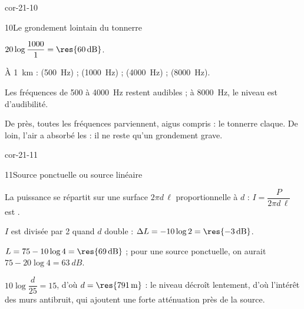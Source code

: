 \begin{blocLivre}{cor-21-10}
\begin{corrige}{10}{Le grondement lointain du tonnerre}
\begin{questions}
\item $20\log\dfrac{1000}{1}=\res{\qty{60}{dB}}$.
\item À \qty{1}{km} :  (\qty{500}{Hz}) ;  (\qty{1000}{Hz}) ;  (\qty{4000}{Hz}) ;
 (\qty{8000}{Hz}).
\item Les fréquences de 500 à \qty{4000}{Hz} restent audibles ; à \qty{8000}{Hz}, le niveau est 
d'audibilité.
\item De près, toutes les fréquences parviennent, aigus compris : le tonnerre claque. De loin, l'air a absorbé les
 : il ne reste qu'un grondement grave.
\end{questions}
\end{corrige}
\end{blocLivre}
\begin{blocLivre}{cor-21-11}
\begin{corrige}{11}{Source ponctuelle ou source linéaire}
\begin{questions}
\item La puissance se répartit sur une surface $2\pi d\,\ell$ proportionnelle à $d$ : $I=\dfrac{P}{2\pi d\,\ell}$ est
.
\item $I$ est divisée par 2 quand $d$ double : $\Delta L=-10\log2=\res{\qty{-3}{dB}}$.
\item $L=75-10\log4=\res{\qty{69}{dB}}$ ; pour une source ponctuelle, on aurait $75-20\log4=\qty{63}{dB}$.
\item $10\log\dfrac{d}{25}=15$, d'où $d=\res{\qty{791}{m}}$ : le niveau décroît lentement, d'où l'intérêt des murs
antibruit, qui ajoutent une forte atténuation près de la source.
\end{questions}
\end{corrige}
\end{blocLivre}
